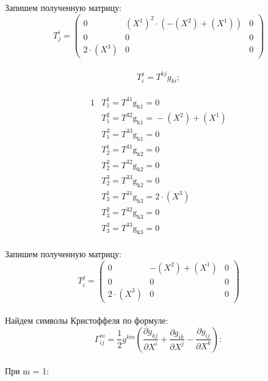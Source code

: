 \documentclass[a4paper, 12pt, oneside]{article}
\begin{document}
Запишем полученную матрицу:\\
\[
T^i_j=\begin{pmatrix}
	0 & (X^1)^2\cdot (-(X^2) + (X^1)) & 0\\
	0 & 0 & 0\\
	2\cdot (X^3) & 0 & 0
\end{pmatrix}
\]\\
\[
T^j_i = T^{kj}g_{ki};
\]\\
\begin{alignat*}{1}
  & T^1_1 = T^{31}\mathrm{g_{k1} = }0 \\
  & T^2_1 = T^{32}\mathrm{g_{k1} = }-(X^2) + (X^1) \\
  & T^3_1 = T^{33}\mathrm{g_{k1} = }0 \\
  & T^1_2 = T^{31}\mathrm{g_{k2} = }0 \\
  & T^2_2 = T^{32}\mathrm{g_{k2} = }0 \\
  & T^3_2 = T^{33}\mathrm{g_{k2} = }0 \\
  & T^1_3 = T^{31}\mathrm{g_{k3} = }2\cdot (X^3) \\
  & T^2_3 = T^{32}\mathrm{g_{k3} = }0 \\
  & T^3_3 = T^{33}\mathrm{g_{k3} = }0 
\end{alignat*}\\
Запишем полученную матрицу:\\
\[
T^j_i=\begin{pmatrix}
	0 & -(X^2) + (X^1) & 0\\
	0 & 0 & 0\\
	2\cdot (X^3) & 0 & 0
\end{pmatrix}
\]\\
Найдем символы Кристоффеля по формуле:\\
\[
\Gamma^m_{ij} = \frac{1}{2}g^{km}(\frac{\partial g_{kj}}{\partial X^i} + \frac{\partial g_{ik}}{\partial X^j} - \frac{\partial g_{ij}}{\partial X^k}):
\]\\
При m = 1:\\
\end{document}
